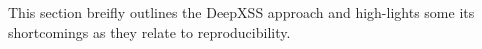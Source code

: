 This section breifly outlines the DeepXSS approach and high-lights some its shortcomings as they relate to reproducibility.